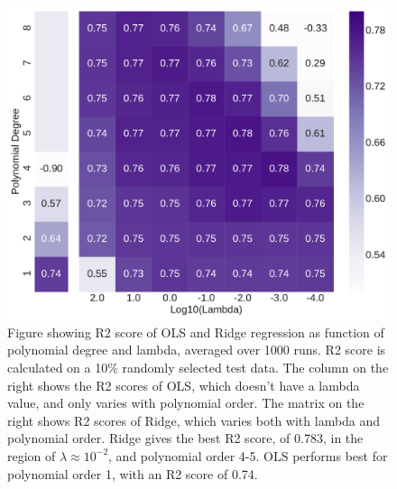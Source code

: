 \documentclass[10pt, twocolumn]{article}
\begin{document}
\begin{figure}[H]
    \centering
    \includegraphics[scale=0.38]{../figs/WH_linreg_r2.pdf}
    \caption{Figure showing R2 score of OLS and Ridge regression as function of polynomial degree and lambda, averaged over 1000 runs. R2 score is calculated on a 10\% randomly selected test data. The column on the right shows the R2 scores of OLS, which doesn't have a lambda value, and only varies with polynomial order. The matrix on the right shows R2 scores of Ridge, which varies both with lambda and polynomial order. Ridge gives the best R2 score, of 0.783, in the region of $\lambda \approx 10^{-2}$, and polynomial order 4-5. OLS performs best for polynomial order 1, with an R2 score of 0.74.}
    \label{fig:OLS_Ridge}
\end{figure}
\end{document}
